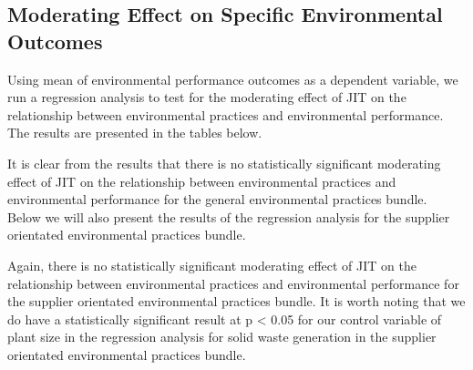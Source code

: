 \subsection*{Moderating Effect on Specific Environmental Outcomes}
Using mean of environmental performance outcomes as a dependent variable, we run a regression analysis to test for the moderating effect of JIT on the relationship between environmental practices and environmental performance.
The results are presented in the tables below.


It is clear from the results that there is no statistically significant moderating effect of JIT on the relationship between environmental practices and environmental performance for the general environmental practices bundle.
\\
Below we will also present the results of the regression analysis for the supplier orientated environmental practices bundle.


Again, there is no statistically significant moderating effect of JIT on the relationship between environmental practices and environmental performance for the supplier orientated environmental practices bundle.
It is worth noting that we do have a statistically significant result at p < 0.05 for our control variable of plant size in the regression analysis for solid waste generation in the supplier orientated environmental practices bundle.